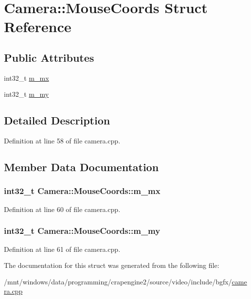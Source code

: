 \hypertarget{struct_camera_1_1_mouse_coords}{\section{Camera\+:\+:Mouse\+Coords Struct Reference}
\label{struct_camera_1_1_mouse_coords}
}
\subsection*{Public Attributes}
\begin{DoxyCompactItemize}
\item 
int32\+\_\+t \hyperlink{struct_camera_1_1_mouse_coords_a9472c6b5fccfba699bf96da48df9af03}{m\+\_\+mx}
\item 
int32\+\_\+t \hyperlink{struct_camera_1_1_mouse_coords_aa6ab9d74c2663e07489dab5ac7c6389b}{m\+\_\+my}
\end{DoxyCompactItemize}


\subsection{Detailed Description}


Definition at line 58 of file camera.\+cpp.



\subsection{Member Data Documentation}
\hypertarget{struct_camera_1_1_mouse_coords_a9472c6b5fccfba699bf96da48df9af03}{
\subsubsection[{m\+\_\+mx}]{\setlength{\rightskip}{0pt plus 5cm}int32\+\_\+t Camera\+::\+Mouse\+Coords\+::m\+\_\+mx}}\label{struct_camera_1_1_mouse_coords_a9472c6b5fccfba699bf96da48df9af03}


Definition at line 60 of file camera.\+cpp.

\hypertarget{struct_camera_1_1_mouse_coords_aa6ab9d74c2663e07489dab5ac7c6389b}{
\subsubsection[{m\+\_\+my}]{\setlength{\rightskip}{0pt plus 5cm}int32\+\_\+t Camera\+::\+Mouse\+Coords\+::m\+\_\+my}}\label{struct_camera_1_1_mouse_coords_aa6ab9d74c2663e07489dab5ac7c6389b}


Definition at line 61 of file camera.\+cpp.



The documentation for this struct was generated from the following file\+:\begin{DoxyCompactItemize}
\item 
/mnt/windows/data/programming/crapengine2/source/video/include/bgfx/\hyperlink{camera_8cpp}{camera.\+cpp}\end{DoxyCompactItemize}
